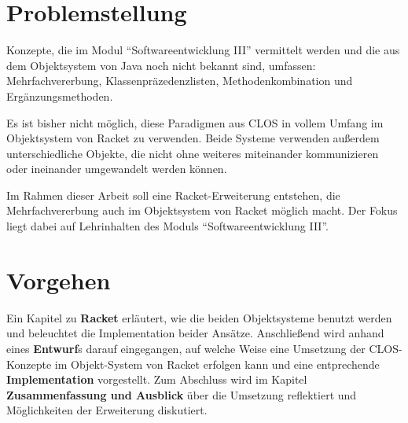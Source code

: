 \section{Problemstellung} 

Konzepte, die im Modul ``Softwareentwicklung III'' vermittelt werden und die aus dem Objektsystem von Java noch nicht bekannt sind, umfassen: Mehrfachvererbung, Klassenpräzedenzlisten, Methodenkombination und Ergänzungsmethoden.

Es ist bisher nicht möglich, diese Paradigmen aus CLOS in vollem Umfang im Objektsystem von Racket zu verwenden. Beide Systeme verwenden außerdem unterschiedliche Objekte, die nicht ohne weiteres miteinander kommunizieren oder ineinander umgewandelt werden können.

Im Rahmen dieser Arbeit soll eine Racket-Erweiterung entstehen, die Mehrfachvererbung auch im Objektsystem von Racket möglich macht. Der Fokus liegt dabei auf Lehrinhalten des Moduls ``Softwareentwicklung III''.


\section{Vorgehen}
Ein Kapitel zu \textbf{Racket} erläutert, wie die beiden Objektsysteme benutzt werden und beleuchtet die Implementation beider Ansätze. Anschließend wird anhand eines \textbf{Entwurf}s darauf eingegangen, auf welche Weise eine Umsetzung der CLOS-Konzepte im Objekt-System von Racket erfolgen kann und eine entprechende \textbf{Implementation} vorgestellt. Zum Abschluss wird im Kapitel \textbf{Zusammenfassung und Ausblick} über die Umsetzung reflektiert und Möglichkeiten der Erweiterung diskutiert.